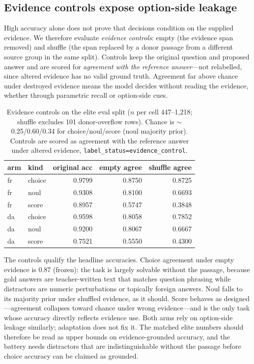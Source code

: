 \documentclass[11pt]{article}
\begin{document}
\subsection{Evidence controls expose option-side leakage}
High accuracy alone does not prove that decisions condition on the
supplied evidence. We therefore evaluate \emph{evidence controls}:
empty (the evidence span removed) and shuffle (the span replaced by a
donor passage from a different source group in the same split).
Controls keep the original question and proposed answer and are scored
for \emph{agreement with the reference answer}---not relabelled, since
altered evidence has no valid ground truth. Agreement far above chance
under destroyed evidence means the model decides without reading the
evidence, whether through parametric recall or option-side cues.

\begin{table}[htbp]
\centering\small
\begin{tabular}{llrrr}
\toprule
arm & kind & original acc & empty agree & shuffle agree \\
\midrule
fr & choice & 0.9799 & 0.8750 & 0.8725 \\
fr & noul   & 0.9308 & 0.8100 & 0.6693 \\
fr & score  & 0.8957 & 0.5747 & 0.3848 \\
\midrule
da & choice & 0.9598 & 0.8058 & 0.7852 \\
da & noul   & 0.9200 & 0.8067 & 0.6667 \\
da & score  & 0.7521 & 0.5550 & 0.4300 \\
\bottomrule
\end{tabular}
\caption{Evidence controls on the elite eval split ($n$ per cell
447--1{,}218; shuffle excludes 101 donor-overflow rows). Chance is
$\sim$0.25/0.60/0.34 for choice/noul/score (noul majority prior).
Controls are scored as agreement with the reference answer under
altered evidence, \texttt{label\_status=evidence\_control}.}
\label{tab:controls}
\end{table}

The controls qualify the headline accuracies. Choice agreement under
empty evidence is 0.87 (frozen): the task is largely solvable without
the passage, because gold answers are teacher-written text that matches
question phrasing while distractors are numeric perturbations or
topically foreign answers. Noul falls to its majority prior under
shuffled evidence, as it should. Score behaves as designed---agreement
collapses toward chance under wrong evidence---and is the only task
whose accuracy directly reflects evidence use. Both arms rely on
option-side leakage similarly; adaptation does not fix it. The matched
elite numbers should therefore be read as upper bounds on
evidence-grounded accuracy, and the battery needs distractors that are
indistinguishable without the passage before choice accuracy can be
claimed as grounded.
\end{document}
